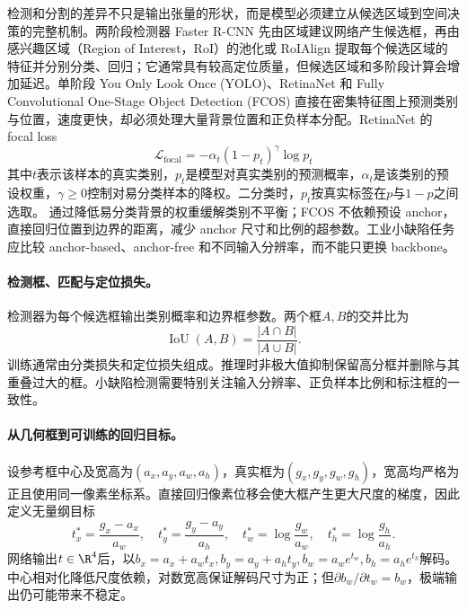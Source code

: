 检测和分割的差异不只是输出张量的形状，而是模型必须建立从候选区域到空间决策的完整机制。两阶段检测器 Faster R-CNN 先由区域建议网络产生候选框，再由 感兴趣区域（Region of Interest，RoI）的池化或 RoIAlign 提取每个候选区域的特征并分别分类、回归；它通常具有较高定位质量，但候选区域和多阶段计算会增加延迟。单阶段 You Only Look Once (YOLO)、RetinaNet 和 Fully Convolutional One-Stage Object Detection (FCOS) 直接在密集特征图上预测类别与位置，速度更快，却必须处理大量背景位置和正负样本分配。RetinaNet 的 focal loss
\begin{equation}
 \mathcal{L}_{\mathrm{focal}}=-\alpha_t(1-p_t)^\gamma\log p_t
\end{equation}
其中$t$表示该样本的真实类别，$p_t$是模型对真实类别的预测概率，$\alpha_t$是该类别的预设权重，$\gamma\geq0$控制对易分类样本的降权。二分类时，$p_t$按真实标签在$p$与$1-p$之间选取。
通过降低易分类背景的权重缓解类别不平衡；FCOS 不依赖预设 anchor，直接回归位置到边界的距离，减少 anchor 尺寸和比例的超参数。工业小缺陷任务应比较 anchor-based、anchor-free 和不同输入分辨率，而不能只更换 backbone。

\paragraph{检测框、匹配与定位损失。}
检测器为每个候选框输出类别概率和边界框参数。两个框$A,B$的交并比为
\begin{equation}
 \operatorname{IoU}(A,B)=\frac{|A\cap B|}{|A\cup B|}.
\end{equation}
训练通常由分类损失和定位损失组成。推理时非极大值抑制保留高分框并删除与其重叠过大的框。小缺陷检测需要特别关注输入分辨率、正负样本比例和标注框的一致性。

\paragraph{从几何框到可训练的回归目标。}
设参考框中心及宽高为$(a_x,a_y,a_w,a_h)$，真实框为$(g_x,g_y,g_w,g_h)$，宽高均严格为正且使用同一像素坐标系。直接回归像素位移会使大框产生更大尺度的梯度，因此定义无量纲目标
\begin{equation}
 t_x^*=\frac{g_x-a_x}{a_w},\quad t_y^*=\frac{g_y-a_y}{a_h},\quad
 t_w^*=\log\frac{g_w}{a_w},\quad t_h^*=\log\frac{g_h}{a_h}.
\end{equation}
网络输出$t\in\R^4$后，以$b_x=a_x+a_wt_x,b_y=a_y+a_ht_y,b_w=a_we^{t_w},b_h=a_he^{t_h}$解码。中心相对化降低尺度依赖，对数宽高保证解码尺寸为正；但$\partial b_w/\partial t_w=b_w$，极端输出仍可能带来不稳定。

